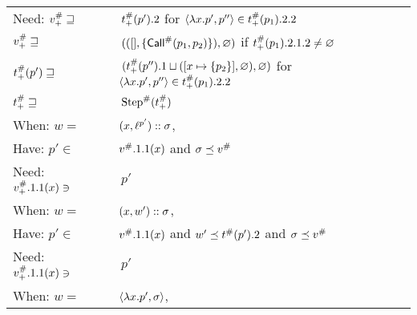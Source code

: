 \begin{center}
\begin{tabular}{|l@{\hskip2pt}l|}
    Need: \hfill ${v}^{\#}_+\sqsupseteq$              & $\:{t}^{\#}_+(p').2$                                                              \hfill for $\langle\lambda x.p',p''\rangle\in{t}^{\#}_+(p_1).2.2$ \\
    \hfill ${v}^{\#}_+\sqsupseteq$                    & $\:(([],\{{\mathsf{Call}}^{\#}(p_1,p_2)\}),\varnothing)$                                      \hfill if ${t}^{\#}_+(p_1).2.1.2\neq\varnothing$                  \\
    \hfill ${t}^{\#}_+(p')\sqsupseteq$             & $\:({t}^{\#}_+(p'').1\sqcup([x\mapsto\{p_2\}],\varnothing),\varnothing)$          \hfill for $\langle\lambda x.p',p''\rangle\in{t}^{\#}_+(p_1).2.2$ \\
    \hfill ${t}^{\#}_+\sqsupseteq$                 & $\:{\textnormal{Step}}^{\#}({t}^{\#}_+)$                                                                                                                             \\
    \hline
    When: \hfill $w=$                                & $(x,{\ell}^{p'})::\sigma$,                                                                                                                       \\
    Have: \hfill $p'\in$                             & ${v}^{\#}.1.1(x)$ and $\sigma\preceq{v}^{\#}$                                                                                                               \\
    Need: \hfill ${v}^{\#}_+.1.1(x)\ni$               & $\:p'$                                                                                                                                                  \\
    \hline
    When: \hfill $w=$                                & $(x,w')::\sigma$,                                                                                                                                      \\
    Have: \hfill $p'\in$                             & ${v}^{\#}.1.1(x)$ and $w'\preceq{t}^{\#}(p').2$ and $\sigma\preceq{v}^{\#}$                                                                               \\
    Need: \hfill ${v}^{\#}_+.1.1(x)\ni$               & $\:p'$                                                                                                                                                  \\
    \hline
    When: \hfill $w=$                                & $\langle\lambda x.p',\sigma\rangle$,                                                                                                                      \\

\end{tabular}
\end{center}
